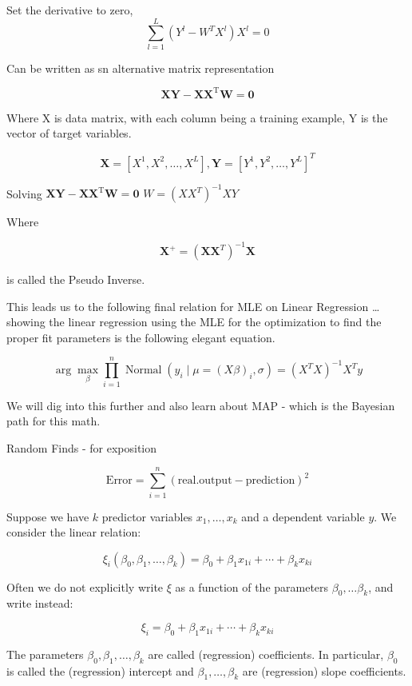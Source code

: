 \documentclass[
  12 pt,
  a4paper,
]{book}
\numberwithin{equation}{section}
\theoremstyle{plain}      %
\theoremstyle{definition} %
\theoremstyle{remark}     %
\theoremstyle{note}         %
\begin{document}
Set the derivative to zero, \[
\sum_{l=1}^{L}\left(Y^{l}-W^{T} X^{l}\right) X^{l}=0
\]

Can be written as sn alternative matrix representation

\[
\mathbf{X Y}-\mathbf{X X}^{\mathrm{T}} \mathbf{W}=\mathbf{0}
\]

Where \(\mathrm{X}\) is data matrix, with each column being a training
example, \(\mathrm{Y}\) is the vector of target variables.

\[
\mathbf{X}=\left[X^{1}, X^{2}, \ldots, X^L\right], \mathbf{Y}=\left[Y^{1}, Y^{2}, \ldots, Y^L\right]^{T}
\]

Solving \(\mathbf{X Y}-\mathbf{X X}^{\mathrm{T}} \mathbf{W}=\mathbf{0}\)
\(W=\left(X X^{T}\right)^{-1} X Y\)

Where

\[
\boldsymbol{X}^{+}=\left(\boldsymbol{X} \boldsymbol{X}^{T}\right)^{-1} \boldsymbol{X}
\]

is called the Pseudo Inverse.

This leads us to the following final relation for MLE on Linear
Regression \ldots{} showing the linear regression using the MLE for the
optimization to find the proper fit parameters is the following elegant
equation.

\[
\arg \max _{\beta} \prod_{i=1}^{n} \operatorname{Normal}\left(y_{i} \mid \mu=(X \beta)_{i}, \sigma\right)=\left(X^{T} X\right)^{-1} X^{T} y
\]

We will dig into this further and also learn about MAP - which is the
Bayesian path for this math.

Random Finds - for exposition

\[
\text {Error} = \sum_{i=1}^{n} (\text{real.output} - \text{prediction}) ^{2}
\]

Suppose we have \(k\) predictor variables \(x_{1}, \ldots, x_{k}\) and a
dependent variable \(y\). We consider the linear relation:

\[
\xi_{i}\left(\beta_{0}, \beta_{1}, \ldots, \beta_{k}\right)=\beta_{0}+\beta_{1} x_{1 i}+\cdots+\beta_{k} x_{k i}
\]

Often we do not explicitly write \(\xi\) as a function of the parameters
\(\beta_{0}, \ldots \beta_{k}\), and write instead:

\[
\xi_{i}=\beta_{0}+\beta_{1} x_{1 i}+\cdots+\beta_{k} x_{k i}
\]

The parameters \(\beta_{0}, \beta_{1}, \ldots, \beta_{k}\) are called
(regression) coefficients. In particular, \(\beta_{0}\) is called the
(regression) intercept and \(\beta_{1}, \ldots, \beta_{k}\) are
(regression) slope coefficients.
\end{document}
